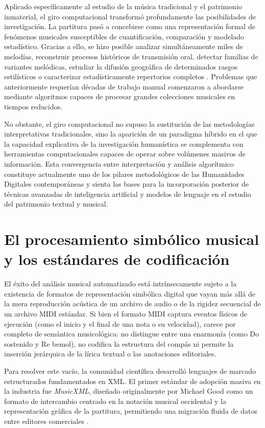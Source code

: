 Aplicado específicamente al estudio de la música tradicional y el patrimonio inmaterial, el giro computacional transformó profundamente las posibilidades de investigación. La partitura pasó a concebirse como una representación formal de fenómenos musicales susceptibles de cuantificación, comparación y modelado estadístico. Gracias a ello, se hizo posible analizar simultáneamente miles de melodías, reconstruir procesos históricos de transmisión oral, detectar familias de variantes melódicas, estudiar la difusión geográfica de determinados rasgos estilísticos o caracterizar estadísticamente repertorios completos \citep{volk2012melodic}. Problemas que anteriormente requerían décadas de trabajo manual comenzaron a abordarse mediante algoritmos capaces de procesar grandes colecciones musicales en tiempos reducidos.

No obstante, el giro computacional no supuso la sustitución de las metodologías interpretativas tradicionales, sino la aparición de un paradigma híbrido en el que la capacidad explicativa de la investigación humanística se complementa con herramientas computacionales capaces de operar sobre volúmenes masivos de información. Esta convergencia entre interpretación y análisis algorítmico constituye actualmente uno de los pilares metodológicos de las Humanidades Digitales contemporáneas y sienta las bases para la incorporación posterior de técnicas avanzadas de inteligencia artificial y modelos de lenguaje en el estudio del patrimonio textual y musical.

\section{El procesamiento simbólico musical y los estándares de codificación}
\label{sec:procesamiento_simbolico}

El éxito del análisis musical automatizado está intrínsecamente sujeto a la existencia de formatos de representación simbólica digital que vayan más allá de la mera reproducción acústica de un archivo de audio o de la rigidez secuencial de un archivo MIDI estándar. Si bien el formato MIDI captura eventos físicos de ejecución (como el inicio y el final de una nota o su velocidad), carece por completo de semántica musicológica: no distingue entre una enarmonía (como Do sostenido y Re bemol), no codifica la estructura del compás ni permite la inserción jerárquica de la lírica textual o las anotaciones editoriales.

Para resolver este vacío, la comunidad científica desarrolló lenguajes de marcado estructurados fundamentados en XML. El primer estándar de adopción masiva en la industria fue \textit{MusicXML}, diseñado originalmente por Michael Good como un formato de intercambio centrado en la notación musical occidental y la representación gráfica de la partitura, permitiendo una migración fluida de datos entre editores comerciales \citep{good2001musicxml, good2011lessons}.

